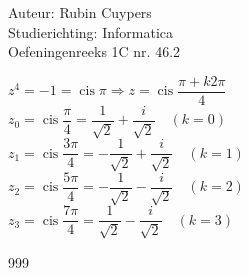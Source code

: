 \documentclass[a4paper]{article}
\begin{document}
  \newcommand{\cis}{\operatorname{cis}}



\noindent \large Auteur: Rubin Cuypers \\
\noindent \large Studierichting:  Informatica\\
\noindent \large Oefeningenreeks 1C  nr. 46.2\\

\medskip

\normalsize

$z^4=-1=\cis\pi \Rightarrow z=\cis\dfrac{\pi+k2\pi}{4}$\\

$z_0=\cis\dfrac{\pi}{4}=\dfrac{1}{\sqrt{2}}+\dfrac{i}{\sqrt{2}} \quad (k=0)$\\

$z_1=\cis\dfrac{3\pi}{4}=-\dfrac{1}{\sqrt{2}}+\dfrac{i}{\sqrt{2}}  \quad(k=1)$\\

$z_2=\cis\dfrac{5\pi}{4}=-\dfrac{1}{\sqrt{2}}-\dfrac{i}{\sqrt{2}}  \quad (k=2)$\\

$z_3=\cis\dfrac{7\pi}{4}=\dfrac{1}{\sqrt{2}}-\dfrac{i}{\sqrt{2}}  \quad (k=3)$\\

\begin{thebibliography}{999}
\end{thebibliography}
\end{document}
